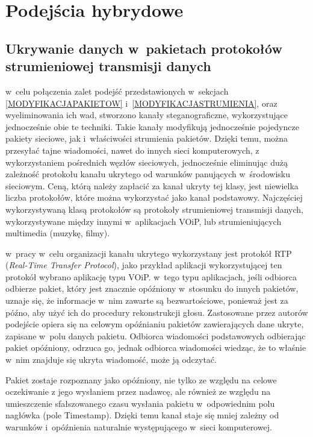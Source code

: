 \documentclass[a4paper, twoside, 12pt]{report}
\begin{document}
    \section{Podejścia hybrydowe}
        \subsection{Ukrywanie danych w~pakietach protokołów strumieniowej transmisji danych}
        w~celu połączenia zalet podejść przedstawionych w~sekcjach
        \ref{MODYFIKACJAPAKIETOW} i~\ref{MODYFIKACJASTRUMIENIA}, oraz wyeliminowania
        ich wad, stworzono kanały steganograficzne, wykorzystujące jednocześnie obie te
        techniki. Takie kanały modyfikują jednocześnie pojedyncze pakiety sieciowe,
        jak i~właściwości strumienia pakietów. Dzięki temu, można przesyłać tajne wiadomości,
        nawet do innych sieci komputerowych, z wykorzystaniem pośrednich węzłów sieciowych,
        jednocześnie eliminując dużą zależność protokołu kanału ukrytego od warunków
        panujących w~środowisku sieciowym. Ceną, którą należy zapłacić za kanał
        ukryty tej klasy, jest niewielka liczba protokołów, które można wykorzystać
        jako kanał podstawowy. Najczęściej wykorzystywaną klasą protokołów są
        protokoły strumieniowej transmisji danych, wykorzystywane między innymi
        w~aplikacjach VOiP, lub strumieniujących multimedia (muzykę, filmy).

        w~pracy \cite{VOIPSTEGANOGRAPHY} w~celu organizacji kanału ukrytego wykorzystany
        jest protokół RTP (\emph{Real-Time Transfer Protocol}), jako przykład aplikacji
        wykorzystującej ten protokół wybrano aplikację typu VOiP. w~tego typu aplikacjach,
        jeśli odbiorca odbierze pakiet, który jest znacznie opóźniony w~stosunku
        do innych pakietów, uznaje się, że informacje w~nim zawarte są bezwartościowe,
        ponieważ jest za późno, aby użyć ich do procedury rekonstrukcji głosu.
        Zastosowane przez autorów podejście opiera się na celowym opóźnianiu pakietów
        zawierających dane ukryte, zapisane w~polu danych pakietu.
        Odbiorca wiadomości podstawowych odbierając pakiet
        opóźniony, odrzuca go, jednak odbiorca wiadomości wiedząc, że to właśnie
        w~nim znajduje się ukryta wiadomość, może ją odczytać.

        Pakiet zostaje rozpoznany jako opóźniony, nie tylko ze względu na celowe
        oczekiwanie z jego wysłaniem przez nadawcę, ale również ze względu
        na umieszczenie sfałszowanego czasu wysłania pakietu w~odpowiednim
        polu nagłówka (pole Timestamp). Dzięki temu kanał staje się mniej zależny
        od warunków i~opóźnienia naturalnie występującego w~sieci komputerowej.
\end{document}
